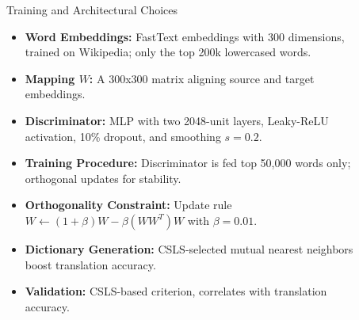 \documentclass[final]{beamer}
\newlength{\sepwid}
\newlength{\onecolwid}
\newlength{\twocolwid}
\begin{document}
\begin{frame}[t]
\begin{columns}[t]
\begin{column}{\twocolwid}

\begin{block}{Training and Architectural Choices}
\begin{itemize}
    \item \textbf{Word Embeddings:} FastText embeddings with 300 dimensions, trained on Wikipedia; only the top 200k lowercased words.
    \item \textbf{Mapping \( W \):} A 300x300 matrix aligning source and target embeddings.
    \item \textbf{Discriminator:} MLP with two 2048-unit layers, Leaky-ReLU activation, 10\% dropout, and smoothing \( s = 0.2 \).
    \item \textbf{Training Procedure:} Discriminator is fed top 50,000 words only; orthogonal updates for stability.
    \item \textbf{Orthogonality Constraint:} Update rule \( W \leftarrow (1 + \beta)W - \beta(WW^{T})W \) with \( \beta = 0.01 \).
    \item \textbf{Dictionary Generation:} CSLS-selected mutual nearest neighbors boost translation accuracy.
    \item \textbf{Validation:} CSLS-based criterion, correlates with translation accuracy.
\end{itemize}
\end{block}


\end{column} 

\begin{column}{\sepwid}\end{column} 
\begin{column}{\onecolwid} 



\end{column}
\end{columns}
\end{frame}
\end{document}
